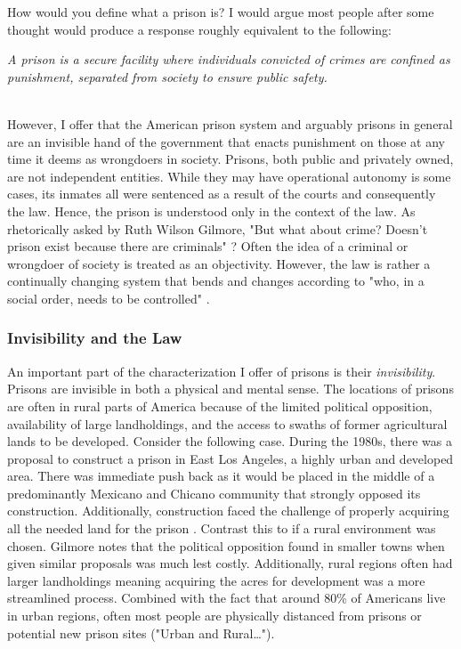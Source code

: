 How would you define what a prison is? I would argue most people after some thought would produce a response roughly equivalent to the following: \\

\begin{minipage}{\dimexpr\textwidth-1cm}
	\itshape
	A prison is a secure facility where individuals convicted of crimes are confined as punishment, separated from society to ensure public safety.
\end{minipage} \\

\noindent
However, I offer that the American prison system and arguably prisons in general are an invisible hand of the government that enacts punishment on those at any time it deems as wrongdoers in society. Prisons, both public and privately owned, are not independent entities. While they may have operational autonomy is some cases, its inmates all were sentenced as a result of the courts and consequently the law. Hence, the prison is understood only in the context of the law. As rhetorically asked by Ruth Wilson Gilmore, "But what about crime? Doesn’t prison exist because there are criminals" \cite*[12]{gilmoreGoldenGulagPrisons2007}? Often the idea of a criminal or wrongdoer of society is treated as an objectivity. However, the law is rather a continually changing system that bends and changes according to "who, in a social order, needs to be controlled" \mancite\cite[12]{gilmoreGoldenGulagPrisons2007}. 

\subsubsection*{Invisibility and the Law}
An important part of the characterization I offer of prisons is their \textit{invisibility}. Prisons are invisible in both a physical and mental sense. The locations of prisons are often in rural parts of America because of the limited political opposition, availability of large landholdings, and the access to swaths of former agricultural lands to be developed. Consider the following case. During the 1980s, there was a proposal to construct a prison in East Los Angeles, a highly urban and developed area. There was immediate push back as it would be placed in the middle of a predominantly Mexicano and Chicano community that strongly opposed its construction. Additionally, construction faced the challenge of properly acquiring all the needed land for the prison \cite[103]{gilmoreGoldenGulagPrisons2007}. Contrast this to if a rural environment was chosen. Gilmore notes that the political opposition found in smaller towns when given similar proposals was much lest costly. Additionally, rural regions often had larger landholdings meaning acquiring the acres for development was a more streamlined process. Combined with the fact that around 80\% of Americans live in urban regions, often most people are physically distanced from prisons or potential new prison sites \nocite{UrbanRuralPopulations} ("Urban and Rural\ldots").

